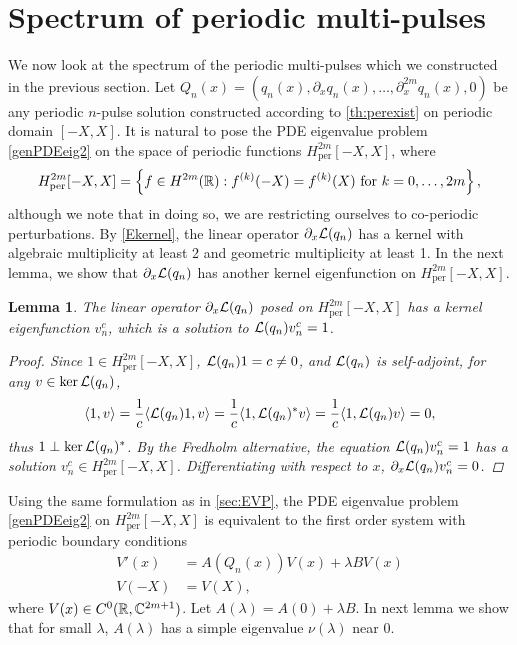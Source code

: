 \documentclass[12pt]{elsarticle}
\theoremstyle{plain}
\newtheorem{lemma}[theorem]{Lemma}
\theoremstyle{definition}
\theoremstyle{remark}
\numberwithin{theorem}{section}
\numberwithin{equation}{section}
\begin{document}
\section{Spectrum of periodic multi-pulses}\label{sec:perstab}

We now look at the spectrum of the periodic multi-pulses which we constructed in the previous section. Let $Q_n(x) = (q_n(x), \partial_x q_n(x), \dots, \partial_x^{2m} q_n(x), 0)$ be any periodic $n$-pulse solution constructed according to \cref{th:perexist} on periodic domain $[-X, X]$. It is natural to pose the PDE eigenvalue problem \cref{genPDEeig2} on the space of periodic functions $H^{2m}_{\text{per}}[-X,X]$, where
\[
H^{2m}_{\text{per}}[-X,X] = \left\{ f \in H^{2m}(\mathbb{R}) : f^{(k)}(-X) = f^{(k)}(X) \text{ for } k = 0, \dots, 2m \right\},
\]
although we note that in doing so, we are restricting ourselves to co-periodic perturbations. By \cref{Ekernel}, the linear operator $\partial_x \mathcal{L}(q_n)$ has a kernel with algebraic multiplicity at least 2 and geometric multiplicity at least 1. In the next lemma, we show that $\partial_x \mathcal{L}(q_n)$ has another kernel eigenfunction on $H^{2m}_{\text{per}}[-X,X]$. 

\begin{lemma}\label{qnkernel}
The linear operator $\partial_x \mathcal{L}(q_n)$ posed on $H^{2m}_{\text{per}}[-X,X]$ has a kernel eigenfunction $v_n^c$, which is a solution to $\mathcal{L}(q_n)v_n^c = 1$.
\begin{proof}
Since $1 \in H^{2m}_{\text{per}}[-X,X]$, $\mathcal{L}(q_n) 1 = c \neq 0$, and $\mathcal{L}(q_n)$ is self-adjoint, for any $v \in \mathop\mathrm{ker}\nolimits \mathcal{L}(q_n)$,
\begin{align*}
\langle 1, v \rangle = \frac{1}{c} \langle \mathcal{L}(q_n) 1, v \rangle
= \frac{1}{c} \langle  1, \mathcal{L}(q_n)^* v \rangle = \frac{1}{c} \langle  1, \mathcal{L}(q_n) v \rangle = 0,
\end{align*}
thus $1 \perp \mathop\mathrm{ker}\nolimits \mathcal{L}(q_n)^*$. By the Fredholm alternative, the equation $\mathcal{L}(q_n) v_n^c = 1$ has a solution $v_n^c \in H^{2m}_{\text{per}}[-X,X]$. Differentiating with respect to $x$, $\partial_x \mathcal{L}(q_n) v_n^c = 0$.
\end{proof}
\end{lemma}

\noi Using the same formulation as in \cref{sec:EVP}, the PDE eigenvalue problem \cref{genPDEeig2} on $H^{2m}_{\text{per}}[-X,X]$ is equivalent to the first order system with periodic boundary conditions
\begin{equation}\label{PDEeigsystemper3}
\begin{aligned}
V'(x) &= A(Q_n(x))V(x) + \lambda B V(x) \\
V(-X) &= V(X),
\end{aligned}
\end{equation}
where $V(x) \in C^0(\mathbb{R},\mathbb{C}^{2m+1})$. Let $A(\lambda) = A(0) + \lambda B$. In next lemma we show that for small $\lambda$, $A(\lambda)$ has a simple eigenvalue $\nu(\lambda)$ near 0.
\end{document}
